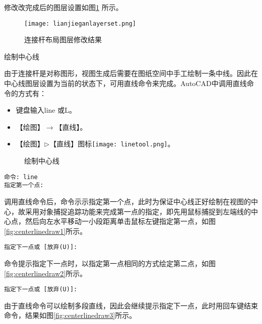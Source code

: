 \begin{procedure}
修改改完成后的图层设置如图\ref{fig:lianjieganlayerset} 所示。
\begin{figure}[htbp]
\centering
\texttt{[image: lianjieganlayerset.png]}
\caption{连接杆布局图层修改结果}\label{fig:lianjieganlayerset}
\end{figure}
\item 绘制中心线

由于连接杆是对称图形，视图生成后需要在图纸空间中手工绘制一条中线。因此在中心线图层设置为当前的状态下，可用直线命令来完成。AutoCAD中调用直线命令的方式有：
\begin{itemize}
\item 键盘输入line 或L。
\item 【绘图】$\rightarrow$【直线】。
\item 【绘图】$\triangleright$【直线】图标\texttt{[image: linetool.png]}。
\end{itemize}

\begin{figure}[htbp]
\centering
{}\hspace{20pt}
\hspace{20pt}
\caption{绘制中心线}
\end{figure}

\begin{lstlisting}
命令: line
指定第一个点:
\end{lstlisting}
调用直线命令后，命令示示指定第一个点，此时为保证中心线正好绘制在视图的中心，故采用对象捕捉追踪功能来完成第一点的指定，即先用鼠标捕捉到左端线的中心点，然后向左水平移动一小段距离单击鼠标左键指定第一点，如图\ref{fig:centerlinedraw1}所示。
\begin{lstlisting}
指定下一点或 [放弃(U)]:
\end{lstlisting}
命令提示指定下一点时，以指定第一点相同的方式绘定第二点，如图\ref{fig:centerlinedraw2}所示。
\begin{lstlisting}
指定下一点或 [放弃(U)]:
\end{lstlisting}
由于直线命令可以绘制多段直线，因此会继续提示指定下一点，此时用回车键结束命令，结果如图\ref{fig:centerlinedraw3}所示。
\end{procedure}
